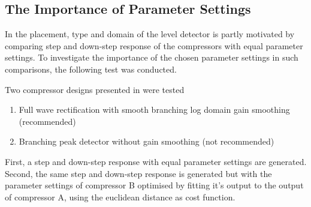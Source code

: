 \documentclass[../main2.tex]{subfiles}
\begin{document}
\subsection{The Importance of Parameter Settings}\label{method_param_opt}
In \cite{reiss2012tutorial} the placement, type and domain of the level detector is partly motivated by comparing step and down-step response of the compressors with equal parameter settings. To investigate the importance of the chosen parameter settings in such comparisons, the following test was conducted.

Two compressor designs presented in \cite{reiss2012} were tested
\begin{enumerate}[label=(\Alph*)]
 \item Full wave rectification with smooth branching log domain gain smoothing (recommended)
\item  Branching peak detector without gain smoothing (not recommended)
\end{enumerate}
First, a step and down-step response with equal parameter settings are generated. Second, the same step and down-step response is generated but with the parameter settings of compressor B optimised by fitting it's output to the output of compressor A, using the euclidean distance as cost function.
\end{document}
